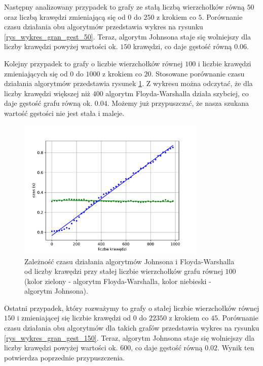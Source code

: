 \documentclass[12pt,a4paper]{book}
\theoremstyle{definition}
\numberwithin{equation}{chapter}
\begin{document}
Następny analizowany przypadek to grafy ze stałą liczbą wierzchołków równą $50$ oraz liczbą krawędzi zmieniającą się od $0$ do $250$ z krokiem co $5$. Porównanie czasu działania obu algorytmów przedstawia wykres na rysunku \ref{rys_wykres_gran_gest_50}. Teraz, algorytm Johnsona staje się wolniejszy dla liczby krawędzi powyżej wartości ok. $150$ krawędzi, co daje gęstość równą $0.06$.

Kolejny przypadek to grafy o liczbie wierzchołków równej $100$ i liczbie krawędzi zmieniających się od $0$ do $1000$ z krokiem co $20$. Stosowane porównanie czasu działania algorytmów przedstawia rysunek \ref{rys_wykres_gran_gest_100}. Z wykresu można odczytać, że dla liczby krawędzi większej niż $400$ algorytm Floyda-Warshalla działa szybciej, co daje gęstość grafu równą ok. $0.04$. Możemy już przypuszczać, że nasza szukana wartość gęstości nie jest stała i maleje.

\begin{figure}[!htp]
\centering
\includegraphics[width=0.8\textwidth]{images/Wykres_granica_gestego_grafu_100_wierzcholkow.pdf}
\caption{Zależność czasu działania algorytmów Johnsona i Floyda-Warshalla od liczby krawędzi przy stałej liczbie wierzchołków grafu równej $100$ (kolor zielony - algorytm Floyda-Warshalla, kolor niebieski - algorytm Johnsona).}
\label{rys_wykres_gran_gest_100}
\end{figure}

Ostatni przypadek, który rozważymy to grafy o stałej liczbie wierzchołków równej $150$ i zmieniającej się liczbie krawędzi od $0$ do $22350$ z krokiem co $45$. Porównanie czasu działania obu algorytmów dla takich grafów przedstawia wykres na rysunku \ref{rys_wykres_gran_gest_150}. Teraz, algorytm Johnsona staje się wolniejszy dla liczby krawędzi powyżej wartości ok. $600$, co daje gęstość równą $0.02$. Wynik ten potwierdza poprzednie przypuszczenia.
\end{document}
